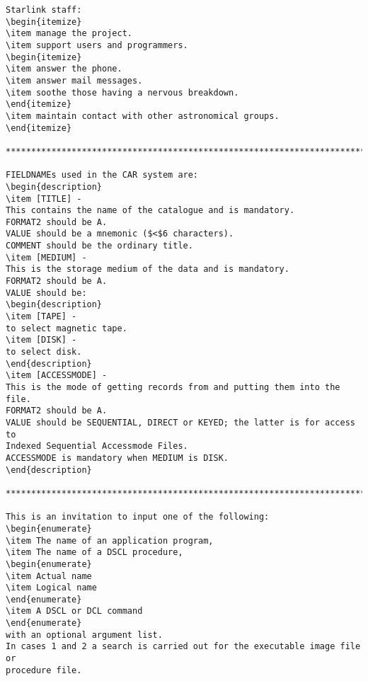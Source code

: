 \begin{verbatim}
Starlink staff:
\begin{itemize}
\item manage the project.
\item support users and programmers.
\begin{itemize}
\item answer the phone.
\item answer mail messages.
\item soothe those having a nervous breakdown.
\end{itemize}
\item maintain contact with other astronomical groups.
\end{itemize}

********************************************************************************

FIELDNAMEs used in the CAR system are:
\begin{description}
\item [TITLE] -
This contains the name of the catalogue and is mandatory.
FORMAT2 should be A.
VALUE should be a mnemonic ($<$6 characters).
COMMENT should be the ordinary title.
\item [MEDIUM] -
This is the storage medium of the data and is mandatory.
FORMAT2 should be A.
VALUE should be:
\begin{description}
\item [TAPE] -
to select magnetic tape.
\item [DISK] -
to select disk.
\end{description}
\item [ACCESSMODE] -
This is the mode of getting records from and putting them into the file.
FORMAT2 should be A.
VALUE should be SEQUENTIAL, DIRECT or KEYED; the latter is for access to
Indexed Sequential Accessmode Files.
ACCESSMODE is mandatory when MEDIUM is DISK.
\end{description}

********************************************************************************

This is an invitation to input one of the following:
\begin{enumerate}
\item The name of an application program,
\item The name of a DSCL procedure,
\begin{enumerate}
\item Actual name
\item Logical name
\end{enumerate}
\item A DSCL or DCL command
\end{enumerate}
with an optional argument list.
In cases 1 and 2 a search is carried out for the executable image file or
procedure file.
\end{verbatim}

